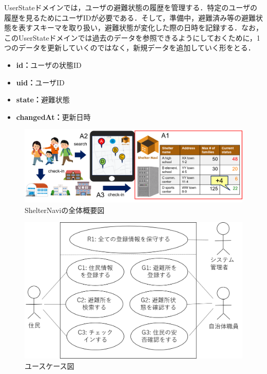 \documentclass[technicalreport,dvipdfmx]{ieicej}
\begin{document}
UserStateドメインでは，ユーザの避難状態の履歴を管理する．特定のユーザの履歴を見るためにユーザIDが必要である．そして，準備中，避難済み等の避難状態を表すスキーマを取り扱い，避難状態が変化した際の日時を記録する．なお，このUserStateドメインでは過去のデータを参照できるようにしておくために，1つのデータを更新していくのではなく，新規データを追加していく形をとる．

\begin{itemize}
     \item{\textbf{id：}}ユーザの状態ID
     \item{\textbf{uid：}}ユーザID
     \item{\textbf{state：}}避難状態
     \item{\textbf{changedAt：}}更新日時
\end{itemize}

\begin{figure}[t]
     \begin{center}
          \includegraphics[scale=0.6,pagebox=cropbox,clip]{img/system.png}
          \caption{ShelterNaviの全体概要図}
          \label{fig:system}
     \end{center}
\end{figure}

\begin{figure}[htbp]
     \begin{center}
          \includegraphics[scale=0.35,pagebox=cropbox,clip]{img/usecase.png}
          \caption{ユースケース図}
          \label{fig:usecase}
     \end{center}
\end{figure}
\end{document}
